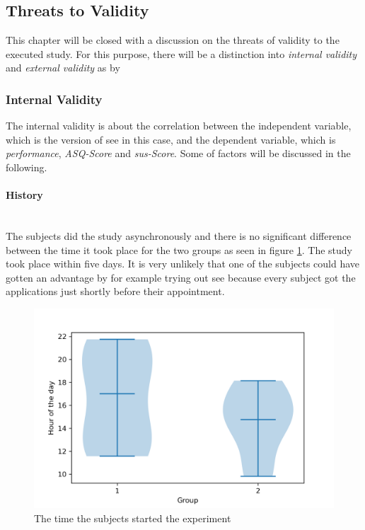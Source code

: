 \subsection{Threats to Validity}
\label{sec:validity}
This chapter will be closed with a discussion on the threats of validity to the executed study.
For this purpose, there will be a distinction into \textit{internal validity} and \textit{external validity} as by \cite{campbell2015experimental}

\subsubsection{Internal Validity}
The internal validity is about the correlation between the independent variable, which is the version of \gls{see} in this case, and the dependent variable, which is \textit{performance}, \textit{\gls{ASQ}-Score} and \textit{\gls{sus}-Score}.
Some of \cite{campbell2015experimental} factors will be discussed in the following.

\paragraph{History}\mbox{}\\
The subjects did the study asynchronously and there is no significant difference between the time it took place for the two groups as seen in figure \ref{fig:date_violin}.
The study took place within five days. 
It is very unlikely that one of the subjects could have gotten an advantage by for example trying out \gls{see} because every subject got the applications just shortly before their appointment.

\begin{figure}[htb]
  \centering
  \includegraphics*[width=1\textwidth]{Evaluation/img/_violin_time.png}
  \caption{The time the subjects started the experiment}
  \label{fig:date_violin}
\end{figure}

